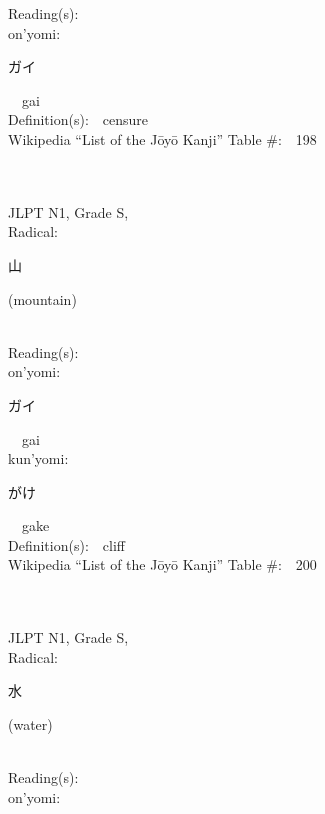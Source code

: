 \begin{multicols}{2}
Reading(s):\ \ \\
{\hspace*{1em}}on'yomi:\ \ \\
{\hspace*{2em}}{\begin{CJK}{UTF8}{min} ガイ \end{CJK}}\ \ gai\ \ \\
Definition(s):\ \ censure \\
Wikipedia ``List of the J\=oy\=o Kanji'' Table \#:\ \ 198 \\
\ \ \\
{\fontsize{34pt}{40pt}  }\ \ \\
{JLPT N1, Grade S, \\Radical:\ \ {\begin{CJK}{UTF8}{min} 山 \end{CJK}} (mountain) } \\
Reading(s):\ \ \\
{\hspace*{1em}}on'yomi:\ \ \\
{\hspace*{2em}}{\begin{CJK}{UTF8}{min} ガイ \end{CJK}}\ \ gai\ \ \\
{\hspace*{1em}}kun'yomi:\ \ \\
{\hspace*{2em}}{\begin{CJK}{UTF8}{min} がけ \end{CJK}}\ \ gake\ \ \\
Definition(s):\ \ cliff \\
Wikipedia ``List of the J\=oy\=o Kanji'' Table \#:\ \ 200 \\
\ \ \\
{\fontsize{34pt}{40pt}  }\ \ \\
{JLPT N1, Grade S, \\Radical:\ \ {\begin{CJK}{UTF8}{min} 水 \end{CJK}} (water) } \\
Reading(s):\ \ \\
{\hspace*{1em}}on'yomi:\ \ \\

\end{multicols}
